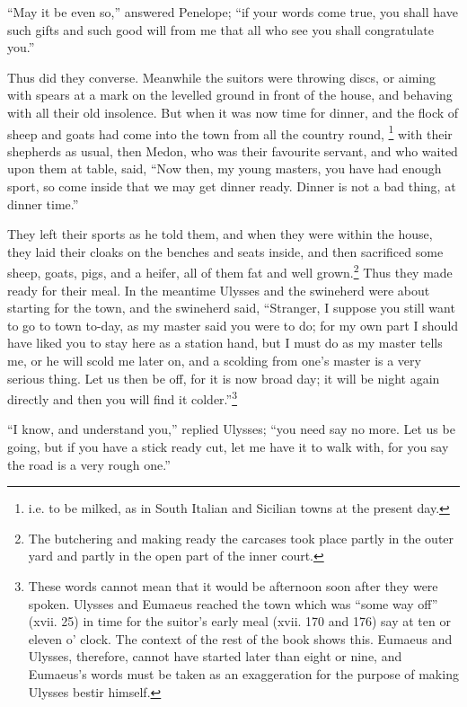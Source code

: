 “May it be even so,” answered Penelope; “if your words come true, you shall
have such gifts and such good will from me that all who see you shall
congratulate you.”

Thus did they converse. Meanwhile the suitors were throwing discs, or aiming
with spears at a mark on the levelled ground in front of the house, and
behaving with all their old insolence. But when it was now time for dinner, and
the flock of sheep and goats had come into the town from all the country round,
\footnote{i.e. to be milked, as in South Italian and Sicilian towns at the present
day.} with their
shepherds as usual, then Medon, who was their favourite servant, and who waited
upon them at table, said, “Now then, my young masters, you have had enough
sport, so come inside that we may get dinner ready. Dinner is not a bad thing,
at dinner time.”

They left their sports as he told them, and when they were within the house,
they laid their cloaks on the benches and seats inside, and then sacrificed
some sheep, goats, pigs, and a heifer, all of them fat and well grown.\footnote{The butchering and making ready the carcases took place partly in the outer
yard and partly in the open part of the inner court.} Thus they made
ready for their meal. In the meantime Ulysses and the swineherd were about
starting for the town, and the swineherd said, “Stranger, I suppose you still
want to go to town to-day, as my master said you were to do; for my own part I
should have liked you to stay here as a station hand, but I must do as my
master tells me, or he will scold me later on, and a scolding from one’s master
is a very serious thing. Let us then be off, for it is now broad day; it will
be night again directly and then you will find it colder.”\footnote{These words cannot mean that it would be afternoon soon after they were
spoken. Ulysses and Eumaeus reached the town which was “some way off” (xvii.
25) in time for the suitor’s early meal (xvii. 170 and 176) say at ten or
eleven o’ clock. The context of the rest of the book shows this. Eumaeus and
Ulysses, therefore, cannot have started later than eight or nine, and
Eumaeus’s words must be taken as an exaggeration for the purpose of making
Ulysses bestir himself.}

“I know, and understand you,” replied Ulysses; “you need say no more. Let us be
going, but if you have a stick ready cut, let me have it to walk with, for you
say the road is a very rough one.”

